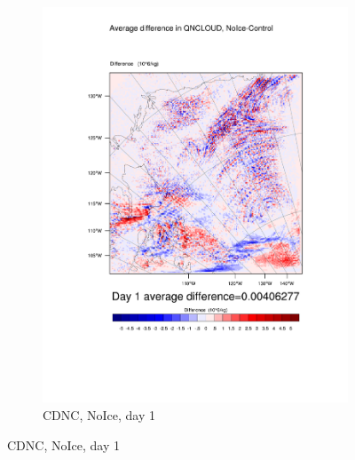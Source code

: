 \begin{figure}
\begin{subfigure}{0.48\textwidth}
		\includegraphics[width=\textwidth]{results/noice/diff_NoIce_QNCLOUD_Day1.pdf}
		\caption{CDNC, NoIce, day 1}
		\label{subfig:CDNCr2Day1}
	\end{subfigure}
	

\end{figure}
